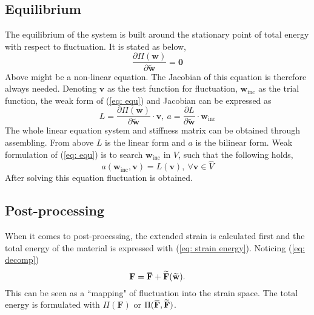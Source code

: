 \documentclass[10pt,a4paper]{scrreprt}
\newcommand{\overbar}[1]{\mkern 1.5mu\overline{\mkern-1.5mu#1\mkern-1.5mu}\mkern 1.5mu}
\begin{document}
\subsection{Equilibrium}
The equilibrium of the system is built around the stationary point of total energy with respect to fluctuation. It is stated as below,
\begin{equation}
\label{eq: equ}
\dfrac{\partial \Pi(\mathbf{w})}{\partial \widetilde{\mathbf{w}}} = \mathbf{0}
\end{equation}
Above might be a non-linear equation. The Jacobian of this equation is therefore always needed. Denoting $\mathbf{v}$ as the test function for fluctuation, $\mathbf{w}_{\text{inc}}$ as the trial function, the weak form of (\ref{eq: equ}) and Jacobian can be expressed as
\begin{equation}
\label{eq: bi and li}
L = \dfrac{\partial \Pi(\mathbf{w})}{\partial \widetilde{\mathbf{w}}} \cdot \mathbf{v}, \ a = \dfrac{\partial L}{\partial \widetilde{\mathbf{w}}} \cdot \mathbf{w}_{\text{inc}}
\end{equation}
The whole linear equation system and stiffness matrix can be obtained through assembling. From above $L$ is the linear form and $a$ is the bilinear form. Weak formulation of (\ref{eq: equ}) is to search $\mathbf{w}_{\text{inc}}$ in $V$, such that the following holds,
\begin{equation}
a(\mathbf{w}_{\text{inc}}, \mathbf{v}) = L(\mathbf{v}),\ \forall \mathbf{v} \in \hat{V}
\end{equation}
After solving this equation fluctuation is obtained.

\subsection{Post-processing}
When it comes to post-processing, the extended strain is calculated first and the total energy of the material is expressed with (\ref{eq: strain energy}). Noticing (\ref{eq: decomp})
\begin{equation}
\mathbf{F} = \overbar{\mathbf{F}} + \widetilde{\mathbf{F}}(\widetilde{\mathbf{w}}).
\end{equation}
This can be seen as a ``mapping" of fluctuation into the strain space. The total energy is formulated with $\Pi(\mathbf{F})$ or $\Pi(\overbar{\mathbf{F}},\widetilde{\mathbf{F}})$.
\end{document}
